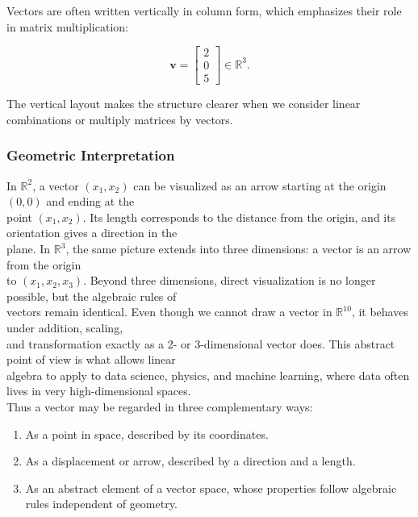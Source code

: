 \documentclass[
  12pt,
  a4paper,
]{article}
\begin{document}
Vectors are often written vertically in column form, which emphasizes
their role in matrix multiplication:

\[\mathbf{v} = \begin{bmatrix}
2 \\
0 \\
5 \end{bmatrix} \in \mathbb{R}^3.\]

The vertical layout makes the structure clearer when we consider linear
combinations or multiply matrices by vectors.

\subsubsection{Geometric Interpretation}\label{geometric-interpretation}

In \(\mathbb{R}^2\), a vector \((x_1, x_2)\) can be visualized as an
arrow starting at the origin \((0,0)\) and ending at the\\
point \((x_1, x_2)\). Its length corresponds to the distance from the
origin, and its orientation gives a direction in the\\
plane. In \(\mathbb{R}^3\), the same picture extends into three
dimensions: a vector is an arrow from the origin\\
to \((x_1, x_2, x_3)\). Beyond three dimensions, direct visualization is
no longer possible, but the algebraic rules of\\
vectors remain identical. Even though we cannot draw a vector in
\(\mathbb{R}^{10}\), it behaves under addition, scaling,\\
and transformation exactly as a 2- or 3-dimensional vector does. This
abstract point of view is what allows linear\\
algebra to apply to data science, physics, and machine learning, where
data often lives in very high-dimensional spaces.\\
Thus a vector may be regarded in three complementary ways:

\begin{enumerate}
\def\labelenumi{\arabic{enumi}.}
\item
  As a point in space, described by its coordinates.
\item
  As a displacement or arrow, described by a direction and a length.
\item
  As an abstract element of a vector space, whose properties follow
  algebraic rules independent of geometry.
\end{enumerate}
\end{document}
